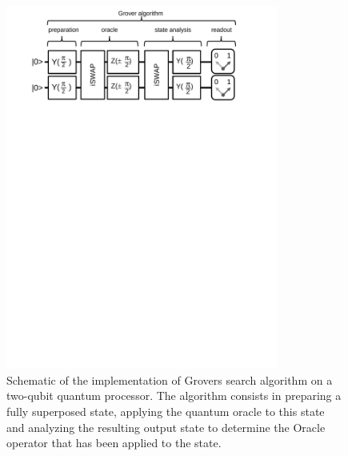 \begin{figure}[ht!]
	\centering
		\includegraphics[width=0.8\textwidth]{./material/papers/grover/figures/grover_algorithm_schematic}
	\caption[Schematic of the implementation of the Grover search algorithm]{Schematic of the implementation of Grovers search algorithm on a two-qubit quantum processor. The algorithm consists in preparing a fully superposed state, applying the quantum oracle to this state and analyzing the resulting output state to determine the Oracle operator that has been applied to the state.} 
	\label{fig:grover_algorithm_schematic}
\end{figure}

